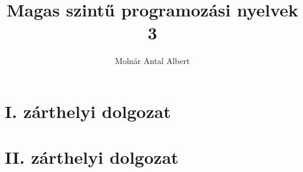 \documentclass[a4paper]{article}
\begin{document}
\title{Magas szintű programozási nyelvek 3}
\author{Molnár Antal Albert}

\lstset{
    basicstyle=\footnotesize,
    float,
    floatplacement=H
}


\vspace*{\fill}
\begin{multicols}{2}[]
\maketitle\vfill\null
\columnbreak
\tableofcontents
\newpage
\end{multicols}
\vspace*{\fill}

\section{I. zárthelyi dolgozat}%
\label{sec:i_zh}


\newpage

\section{II. zárthelyi dolgozat}%
\label{sec:ii_zarthelyi_dolgozat}
\end{document}
